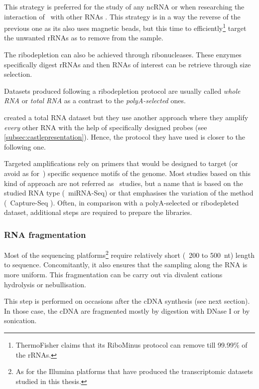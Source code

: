 This strategy is preferred for the study of any \gls{ncRNA} or when researching
the interaction of \mRNAs\ with other \glspl{RNA} . This
strategy is in a way the reverse of the previous one as its also
uses magnetic beads, but this time to efficiently\footnote{ThermoFisher claims
that its RiboMinus protocol can remove till 99.99\% of the \glspl{rRNA}.}
target the unwanted \glspl{rRNA} as to remove from the sample.

The ribodepletion can also be achieved through ribonucleases. These enzymes
specifically digest \glspl{rRNA} and then \glspl{RNA} of interest can be retrieve
through size selection.

Datasets produced following a ribodepletion protocol are usually called
\emph{whole \gls{RNA}} or \emph{total \gls{RNA}} as a contrast to the
\emph{polyA-selected} ones.

\cite{castleData} created a total \gls{RNA} dataset but they use another
approach where they amplify \emph{every} other \gls{RNA} with the help of
specifically designed probes (see \cref{subsec:castlepresentation}). Hence,
the protocol they have used is closer to the following one.

Targeted amplifications rely on primers that would be designed to target (or
avoid as for~\cite{castleData}) specific sequence motifs of the genome. Most
studies based on this kind of approach are not referred as \Rnaseq\ studies, but
a name that is based on the studied \gls{RNA} type (\eg\ \gls{miRNA-Seq}) or
that emphasises the variation of the method (\eg\ Capture-Seq
). Often, in comparison with a polyA-selected or ribodepleted
dataset, additional steps are required to prepare the libraries.


\subsubsection{RNA fragmentation}

Most of the sequencing platforms\footnote{As for the Illumina platforms that have
produced the transcriptomic datasets studied in this thesis.} require relatively
short (\ie\ 200 to 500\ nt) length to sequence. Concomitantly, it also ensures
that the sampling along the \gls{RNA} is more uniform.
This fragmentation can be carry out via divalent cations hydrolysis or
nebullisation.

This step is performed on occasions after the \gls{cDNA} synthesis
(see next section). In those case, the \gls{cDNA} are fragmented mostly
by digestion with DNase I or by sonication.

